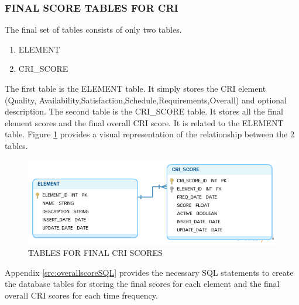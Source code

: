 \documentclass[SDSUThesis.tex]{subfiles}
\begin{document}
        \subsubsection{FINAL SCORE TABLES FOR CRI}
            The final set of tables consists of only two tables.  
            \begin{enumerate}
                \item ELEMENT
                \item CRI\_SCORE
            \end{enumerate}
            The first
            table is the ELEMENT table.  It simply stores the CRI element 
            (Quality, Availability,Satisfaction,Schedule,Requirements,Overall) and 
            optional description. The second table is the CRI\_SCORE table.  
            It stores all the final element scores and the final overall CRI
            score.  It is related to the ELEMENT table.  Figure 
            \ref{fig:final_score_tables} provides a visual representation of the 
            relationship between the 2 tables. 
            
           \begin{figure}[ht]
                \centering
                \includegraphics[scale=.55]{images/final_score_tables.png}
                \caption{TABLES FOR FINAL CRI SCORES}
                \label{fig:final_score_tables}
            \end{figure}
            
            Appendix \ref{src:overallscoreSQL} provides the necessary SQL 
            statements to create the 
            database tables for storing the final scores for each element and the final 
            overall CRI scores for each time frequency.
    
%        
\end{document}
